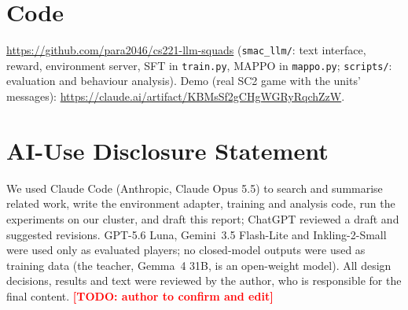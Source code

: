 \documentclass{article} %
\newcommand{\todo}[1]{\textcolor{red}{\textbf{[TODO: #1]}}}
\begin{document}
\section{Code}
\url{https://github.com/para2046/cs221-llm-squads} (\texttt{smac\_llm/}: text interface, reward,
environment server, SFT in \texttt{train.py}, MAPPO in \texttt{mappo.py}; \texttt{scripts/}: evaluation
and behaviour analysis). Demo (real SC2 game with the units' messages):
\url{https://claude.ai/artifact/KBMsSf2gCHgWGRyRqchZzW}.

\section*{AI-Use Disclosure Statement}
We used Claude Code (Anthropic, Claude Opus 5.5) to search and summarise related work, write the
environment adapter, training and analysis code, run the experiments on our cluster, and draft this
report; ChatGPT reviewed a draft and suggested revisions. GPT-5.6 Luna, Gemini~3.5 Flash-Lite and
Inkling-2-Small were used only as evaluated players; no closed-model outputs were used as training
data (the teacher, Gemma~4 31B, is an open-weight model). All design decisions, results and text were
reviewed by the author, who is responsible for the final content. \todo{author to confirm and edit}



\end{document}
